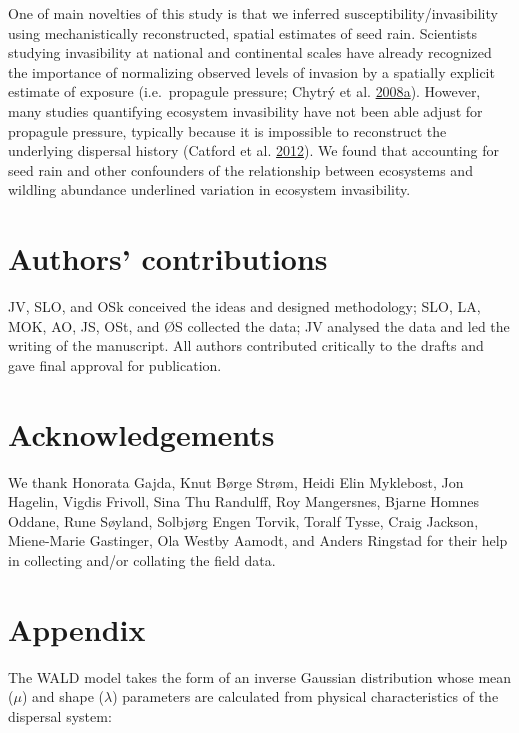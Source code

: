 \documentclass[
]{article}
\begin{document}
One of main novelties of this study is that we inferred susceptibility/invasibility using mechanistically reconstructed, spatial estimates of seed rain.
Scientists studying invasibility at national and continental scales have already recognized the importance of normalizing observed levels of invasion by a spatially explicit estimate of exposure (i.e.~propagule pressure; Chytrý et al. \protect\hyperlink{ref-chytrySeparatingHabitatInvasibility2008}{2008}\protect\hyperlink{ref-chytrySeparatingHabitatInvasibility2008}{a}).
However, many studies quantifying ecosystem invasibility have not been able adjust for propagule pressure, typically because it is impossible to reconstruct the underlying dispersal history (Catford et al. \protect\hyperlink{ref-catfordQuantifyingLevelsBiological2012}{2012}).
We found that accounting for seed rain and other confounders of the relationship between ecosystems and wildling abundance underlined variation in ecosystem invasibility.

\hypertarget{authors-contributions}{%
\section{Authors' contributions}\label{authors-contributions}}

JV, SLO, and OSk conceived the ideas and designed methodology; SLO, LA, MOK, AO, JS, OSt, and ØS collected the data; JV analysed the data and led the writing of the manuscript. All authors contributed critically to the drafts and gave final approval for publication.

\hypertarget{acknowledgements}{%
\section{Acknowledgements}\label{acknowledgements}}

We thank Honorata Gajda, Knut Børge Strøm, Heidi Elin Myklebost, Jon Hagelin, Vigdis Frivoll, Sina Thu Randulff, Roy Mangersnes, Bjarne Homnes Oddane, Rune Søyland, Solbjørg Engen Torvik, Toralf Tysse, Craig Jackson, Miene-Marie Gastinger, Ola Westby Aamodt, and Anders Ringstad for their help in collecting and/or collating the field data.

\hypertarget{appendix}{%
\section{Appendix}\label{appendix}}

The WALD model takes the form of an inverse Gaussian distribution whose mean (\(\mu\)) and shape (\(\lambda\)) parameters are calculated from physical characteristics of the dispersal system:
\end{document}
